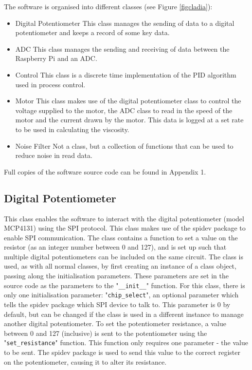 \documentclass[twoside,a4]{report}
\def\br{\newline \newline \noindent}
\def\rpi{Raspberry Pi }
\begin{document}
	\noindent
	The software is organised into different classes (see Figure \ref{figcladia}):
	\begin{itemize}
		\item Digital Potentiometer \newline 
		This class manages the sending of data to a digital potentiometer and keeps a record of some key data.
		\item ADC \newline 
		This class manages the sending and receiving of data between the \rpi and an ADC.
		\item Control\newline 
		This class is a discrete time implementation of the PID algorithm used in process control.
		\item Motor \newline
		This class makes use of the digital potentiometer class to control the voltage supplied to the motor, the ADC class to read in the speed of the motor and the current drawn by the motor. This data is logged at a set rate to be used in calculating the viscosity.
		\item Noise Filter \newline
		Not a class, but a collection of functions that can be used to reduce noise in read data.
	\end{itemize}
	Full copies of the software source code can be found in Appendix 1.
	
	\subsection*{Digital Potentiometer} %
	This class enables the software to interact with the digital potentiometer (model MCP4131) using the SPI protocol. This class makes use of the spidev package to enable SPI communication. The class contains a function to set a value on the resistor (as an integer number between 0 and 127), and is set up such that multiple digital potentiometers can be included on the same circuit.\br
	The class is used, as with all normal classes, by first creating an instance of a class object, passing along the initialisation parameters. These parameters are set in the source code as the parameters to the "\texttt{\_\_init\_\_}" function. For this class, there is only one initialisation parameter: "\texttt{chip\_select}", an optional parameter which tells the spidev package which SPI device to talk to. This parameter is 0 by default, but can be changed if the class is used in a different instance to manage another digital potentiometer.\br
	To set the potentiometer resistance, a value between 0 and 127 (inclusive) is sent to the potentiometer using the "\texttt{set\_resistance}" function. This function only requires one parameter - the value to be sent. The spidev package is used to send this value to the correct register on the potentiometer, causing it to alter its resistance.
	
\end{document}

